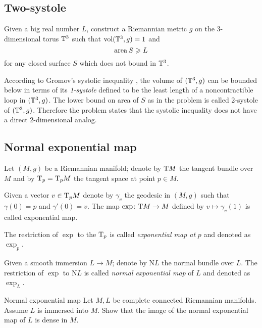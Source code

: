 \subsection*{Two-systole}

\begin{pr}{} Given a big real number $L$,
construct a Riemannian metric $g$ on the 3-dimensional torus $\mathbb{T}^3$ such that $\operatorname{\rm vol}(\mathbb{T}^3,g)=1$
and \[\operatorname{\rm area} S\geqslant L\]
for any closed surface $S$ which does not bound in $\mathbb{T}^3$.
\end{pr}

According to Gromov's systolic inequality \cite[see][]{gromov-filling}, the volume of $(\mathbb{T}^3,g)$ can be bounded below in terms of its \emph{1-systole} defined to be the least length of a noncontractible loop in $(\mathbb{T}^3,g)$.
The lower bound on area of $S$ as in the problem is called 2-systole of $(\mathbb{T}^3,g)$.
Therefore the problem states that the systolic inequality does not have a direct 2-dimensional analog.

\subsection*{Normal exponential map\easy}

\label{page:Normal exponential map}

Let $(M,g)$ be a Riemannian manifold;
denote by $\mathrm{T} M$ the tangent bundle over $M$ and by $\mathrm{T}_p=\mathrm{T}_pM$ the tangent space at point $p\in M$.

Given a vector $v\in\mathrm{T}_pM$ denote by $\gamma_v$ the geodesic in $(M,g)$
such that $\gamma(0)=p$ and $\gamma'(0)=v$.
The map $\exp\colon\mathrm{T} M\to M$ defined by $v\mapsto \gamma_v(1)$ is called exponential map.

The restriction of $\exp$ to the $\mathrm{T}_p$ is called \emph{exponential map at} $p$ and denoted as $\exp_p$.

Given a smooth immersion $L\to M$;
denote by $\mathrm{N} L$ the normal bundle over $L$.
The restriction of $\exp$ to $\mathrm{N} L$ is called {}\emph{normal exponential map} of $L$ and denoted as $\exp_L$.

\begin{pr}{\easy}{Normal exponential map}\label{Normal exponential map}
Let $M,L$ be complete connected Riemannian manifolds.
Assume $L$ is immersed into $M$.
Show that the image  of the 
normal exponential map of $L$ is dense in $M$.
\end{pr}

